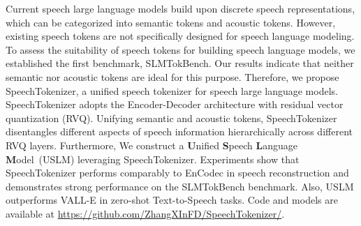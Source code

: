 


Current speech large language models build upon discrete speech representations, which can be categorized into semantic tokens and acoustic tokens. However, existing speech tokens are not specifically designed for speech language modeling. To assess the suitability of speech tokens for building speech language models, we established the first benchmark, SLMTokBench. Our results indicate that neither semantic nor acoustic tokens are ideal for this purpose. Therefore, we propose SpeechTokenizer, a unified speech tokenizer for speech large language models. SpeechTokenizer adopts the Encoder-Decoder architecture with residual vector quantization (RVQ). Unifying semantic and acoustic tokens, SpeechTokenizer disentangles different aspects of speech information hierarchically across different RVQ layers. Furthermore, We construct a \textbf{U}nified \textbf{S}peech \textbf{L}anguage \textbf{M}odel~(USLM) leveraging SpeechTokenizer. Experiments show that SpeechTokenizer performs comparably to EnCodec in speech reconstruction and demonstrates strong performance on the SLMTokBench benchmark. Also, USLM outperforms VALL-E in zero-shot Text-to-Speech tasks. Code and models are available at \url{https://github.com/ZhangXInFD/SpeechTokenizer/}.

